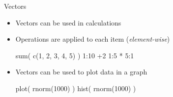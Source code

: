 \documentclass[
  ignorenonframetext,
]{beamer}
\newenvironment{Shaded}{\begin{snugshade}}{\end{snugshade}}
\newcommand{\DecValTok}[1]{\textcolor[rgb]{0.00,0.00,0.81}{#1}}
\newcommand{\FunctionTok}[1]{\textcolor[rgb]{0.00,0.00,0.00}{#1}}
\newcommand{\NormalTok}[1]{#1}
\newcommand{\SpecialCharTok}[1]{\textcolor[rgb]{0.00,0.00,0.00}{#1}}
\begin{document}
\begin{frame}[fragile]{Vectors}
\protect\hypertarget{vectors-1}{}
\begin{itemize}
\item
  Vectors can be used in calculations
\item
  Operations are applied to each item (\emph{element-wise})

\begin{Shaded}
\begin{Highlighting}[]
\FunctionTok{sum}\NormalTok{( }\FunctionTok{c}\NormalTok{(}\DecValTok{1}\NormalTok{, }\DecValTok{2}\NormalTok{, }\DecValTok{3}\NormalTok{, }\DecValTok{4}\NormalTok{, }\DecValTok{5}\NormalTok{) )}
\DecValTok{1}\SpecialCharTok{:}\DecValTok{10} \SpecialCharTok{+}\DecValTok{2}
\DecValTok{1}\SpecialCharTok{:}\DecValTok{5} \SpecialCharTok{*} \DecValTok{5}\SpecialCharTok{:}\DecValTok{1}
\end{Highlighting}
\end{Shaded}
\item
  Vectors can be used to plot data in a graph

\begin{Shaded}
\begin{Highlighting}[]
\FunctionTok{plot}\NormalTok{( }\FunctionTok{rnorm}\NormalTok{(}\DecValTok{1000}\NormalTok{) )}
\FunctionTok{hist}\NormalTok{( }\FunctionTok{rnorm}\NormalTok{(}\DecValTok{1000}\NormalTok{) )}
\end{Highlighting}
\end{Shaded}
\end{itemize}
\end{frame}
\end{document}
